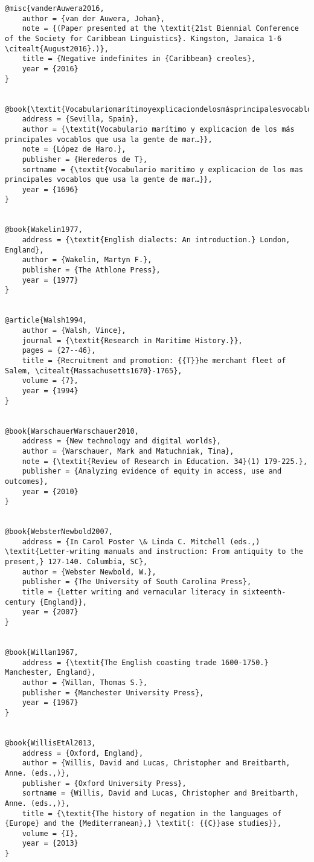 \begin{verbatim}
@misc{vanderAuwera2016,
	author = {van der Auwera, Johan},
	note = {(Paper presented at the \textit{21st Biennial Conference of the Society for Caribbean Linguistics}. Kingston, Jamaica 1-6 \citealt{August2016}.)},
	title = {Negative indefinites in {Caribbean} creoles},
	year = {2016}
}


@book{\textit{Vocabulariomarítimoyexplicaciondelosmásprincipalesvocablosqueusalagentedemar…}1696,
	address = {Sevilla, Spain},
	author = {\textit{Vocabulario marítimo y explicacion de los más principales vocablos que usa la gente de mar…}},
	note = {López de Haro.},
	publisher = {Herederos de T},
	sortname = {\textit{Vocabulario maritimo y explicacion de los mas principales vocablos que usa la gente de mar…}},
	year = {1696}
}


@book{Wakelin1977,
	address = {\textit{English dialects: An introduction.} London, England},
	author = {Wakelin, Martyn F.},
	publisher = {The Athlone Press},
	year = {1977}
}


@article{Walsh1994,
	author = {Walsh, Vince},
	journal = {\textit{Research in Maritime History.}},
	pages = {27--46},
	title = {Recruitment and promotion: {{T}}he merchant fleet of Salem, \citealt{Massachusetts1670}-1765},
	volume = {7},
	year = {1994}
}


@book{WarschauerWarschauer2010,
	address = {New technology and digital worlds},
	author = {Warschauer, Mark and Matuchniak, Tina},
	note = {\textit{Review of Research in Education. 34}(1) 179-225.},
	publisher = {Analyzing evidence of equity in access, use and outcomes},
	year = {2010}
}


@book{WebsterNewbold2007,
	address = {In Carol Poster \& Linda C. Mitchell (eds.,) \textit{Letter-writing manuals and instruction: From antiquity to the present,} 127-140. Columbia, SC},
	author = {Webster Newbold, W.},
	publisher = {The University of South Carolina Press},
	title = {Letter writing and vernacular literacy in sixteenth-century {England}},
	year = {2007}
}


@book{Willan1967,
	address = {\textit{The English coasting trade 1600-1750.} Manchester, England},
	author = {Willan, Thomas S.},
	publisher = {Manchester University Press},
	year = {1967}
}


@book{WillisEtAl2013,
	address = {Oxford, England},
	author = {Willis, David and Lucas, Christopher and Breitbarth, Anne. (eds.,)},
	publisher = {Oxford University Press},
	sortname = {Willis, David and Lucas, Christopher and Breitbarth, Anne. (eds.,)},
	title = {\textit{The history of negation in the languages of {Europe} and the {Mediterranean},} \textit{: {{C}}ase studies}},
	volume = {I},
	year = {2013}
}



\end{verbatim}
